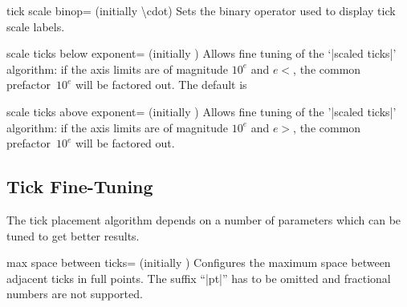 \begin{pgfplotskey}{tick scale binop= (initially \textbackslash cdot)}
	Sets the binary operator used to display tick scale labels.
\begin{codeexample}[]
\end{codeexample}

\begin{codeexample}[]
\end{codeexample}
\end{pgfplotskey}

\makeatletter
\let\itsinitial=\pgfplots@scale@ticks@below@exponent
\makeatother
\begin{pgfplotskey}{scale ticks below exponent= (initially \itsinitial)}
Allows fine tuning of the `|scaled ticks|' algorithm: if the axis limits are of magnitude $10^e$ and $e<$, the common prefactor~$10^e$ will be factored out. The default is 
\end{pgfplotskey}

\makeatletter
\let\itsinitial=\pgfplots@scale@ticks@above@exponent
\makeatother
\begin{pgfplotskey}{scale ticks above exponent= (initially \itsinitial)}
Allows fine tuning of the '|scaled ticks|' algorithm: if the axis limits are of magnitude $10^e$ and $e>$, the common prefactor~$10^e$ will be factored out.
\end{pgfplotskey}


\subsection{Tick Fine-Tuning}
The tick placement algorithm depends on a number of parameters which can be tuned to get better results.
\begin{pgfplotskey}{max space between ticks= (initially \axisdefaulttickwidth)}
\label{maxspacebetweenticks}
	Configures the maximum space between adjacent ticks in full points. The suffix ``|pt|'' has to be omitted and fractional numbers are not supported.
\end{pgfplotskey}

